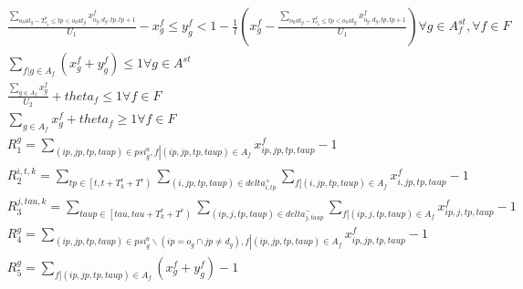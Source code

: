 \begin{align}
  & \frac{\underset{o_hat_{g} - T_{o_{g}}^{s} \leq tp < o_hat_{g}}{\sum} x_{o_{g} , d_{g} , tp , tp + 1}^{f}}{U_{1}} - x_{g}^{f} \leq y_{g}^{f} < 1 - \frac{1}{l} \left(x_{g}^{f} - \frac{\underset{o_hat_{g} - T_{o_{g}}^{s} \leq tp < o_hat_{g}}{\sum} x_{o_{g} , d_{g} , tp , tp + 1}^{f}}{U_{1}}\right) \forall g \in A_{f}^{\mathit{st}} , \forall f \in F \tag{eq\_0018} \\
  & \sum_{f \left|\right. g \in A_{f}} \left(x_{g}^{f} + y_{g}^{f}\right) \leq 1 \forall g \in A^{\mathit{st}} \tag{eq\_0019} \\
  & \frac{\sum_{g \in A_{f}} x_{g}^{f}}{U_{2}} + \mathit{theta}_{f} \leq 1 \forall f \in F \tag{eq\_0020} \\
  & \sum_{g \in A_{f}} x_{g}^{f} + \mathit{theta}_{f} \geq 1 \forall f \in F \tag{eq\_0021} \\
  & R_{1}^{g} = \sum_{\left(ip , jp , tp , taup\right) \in \mathit{psi}_{g}^{a}, f \left|\right. \left(ip , jp , tp , taup\right) \in A_{f}} x_{ip , jp , tp , taup}^{f} - 1 \tag{eq\_0026\_a} \\
  & R_{2}^{i , t , k} = \sum_{tp \in \left[t , t + T_{k}^{r} + T^{r}\right)} \underset{\left(i , jp , tp , taup\right) \in \mathit{delta}_{i , tp}^{+}}{\sum} \sum_{f \left|\right. \left(i , jp , tp , taup\right) \in A_{f}} x_{i , jp , tp , taup}^{f} - 1 \tag{eq\_0026\_b} \\
  & R_{3}^{j , \mathit{tau} , k} = \sum_{taup \in \left[\mathit{tau} , \mathit{tau} + T_{k}^{r} + T^{r}\right)} \underset{\left(ip , j , tp , taup\right) \in \mathit{delta}_{j , taup}^{-}}{\sum} \sum_{f \left|\right. \left(ip , j , tp , taup\right) \in A_{f}} x_{ip , j , tp , taup}^{f} - 1 \tag{eq\_0026\_c} \\
  & R_{4}^{g} = \sum_{\left(ip , jp , tp , taup\right) \in \mathit{psi}_{g}^{a} \backslash \left(ip = o_{g} \cap jp \neq d_{g}\right), f \left|\right. \left(ip , jp , tp , taup\right) \in A_{f}} x_{ip , jp , tp , taup}^{f} - 1 \tag{eq\_0026\_d} \\
  & R_{5}^{g} = \sum_{f \left|\right. \left(ip , jp , tp , taup\right) \in A_{f}} \left(x_{g}^{f} + y_{g}^{f}\right) - 1 \tag{eq\_0026\_e} \\
\end{align}
